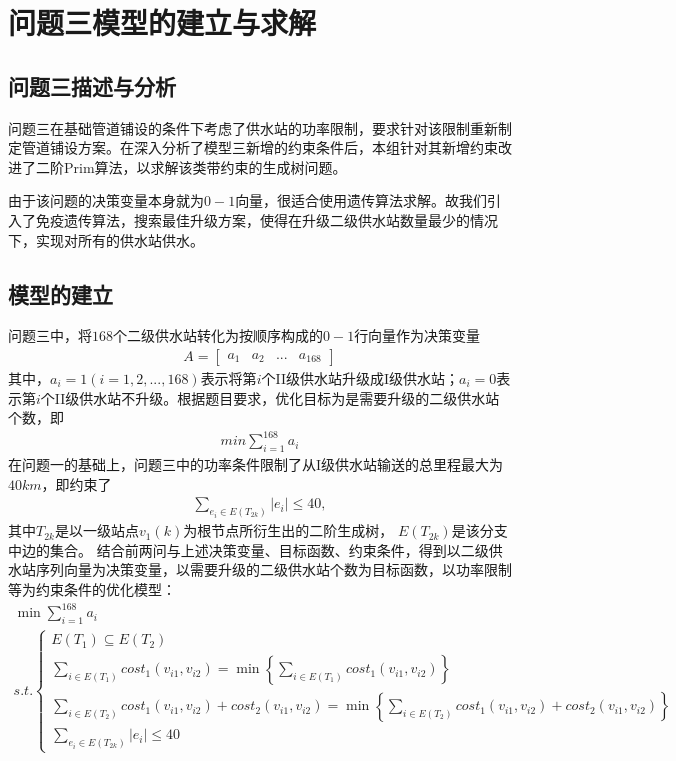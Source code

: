 \documentclass{whutmod}
\begin{document}
	
	

    \section{问题三模型的建立与求解}
   		\subsection{问题三描述与分析}
   		问题三在基础管道铺设的条件下考虑了供水站的功率限制，要求针对该限制重新制定管道铺设方案。在深入分析了模型三新增的约束条件后，本组针对其新增约束改进了二阶Prim算法，以求解该类带约束的生成树问题。
   		
   		由于该问题的决策变量本身就为$0-1$向量，很适合使用遗传算法求解。故我们引入了免疫遗传算法，搜索最佳升级方案，使得在升级二级供水站数量最少的情况下，实现对所有的供水站供水。
    	\subsection{模型的建立}
    	问题三中，将$168$个二级供水站转化为按顺序构成的$0-1$行向量作为决策变量
    	\begin{gather}
    	A=
    	\begin{bmatrix}
    	a_1&a_2&...&a_{168}
    	\end{bmatrix}
    	\end{gather}
    	其中，$a_i=1(i=1,2,...,168)$表示将第$i$个II级供水站升级成I级供水站；$a_i=0$表示第$i$个II级供水站不升级。根据题目要求，优化目标为是需要升级的二级供水站个数，即
    	\begin{gather}
    	min\sum_{i=1}^{168}a_i
    	\end{gather}
    	在问题一的基础上，问题三中的功率条件限制了从I级供水站输送的总里程最大为$40km$，即约束了
    	\begin{gather}
    	\sum_{e_i\in E(T_{2k})}|e_i|\leq 40,
    	\end{gather}
    	其中$T_{2k}$是以一级站点$v_1(k)$为根节点所衍生出的二阶生成树， $E(T_{2k})$是该分支中边的集合。 结合前两问与上述决策变量、目标函数、约束条件，得到以二级供水站序列向量为决策变量，以需要升级的二级供水站个数为目标函数，以功率限制等为约束条件的优化模型：
    	\begin{gather}
    	\min \sum_{i=1}^{168}a_i\\
    	s.t.
    	\left\{\begin{matrix}
    	E(T_{1})\subseteq  E(T_{2})\\ 
    	\sum_{i\in E(T_1) }cost_1(v_{i1},v_{i2})=\min\left \{ 	\sum_{i\in E(T_1) }cost_1(v_{i1},v_{i2}) \right \} \\ 
    	\sum_{i\in E(T_2) }cost_1(v_{i1},v_{i2})+cost_2(v_{i1},v_{i2}) =\min \left\{ \sum_{i\in E(T_2) }cost_1(v_{i1},v_{i2})+cost_2(v_{i1},v_{i2}) \right \}	\\
    	\sum_{e_i\in E(T_{2k})}|e_i|\leq 40
    	\end{matrix}\right.
    	\end{gather}
\end{document}
